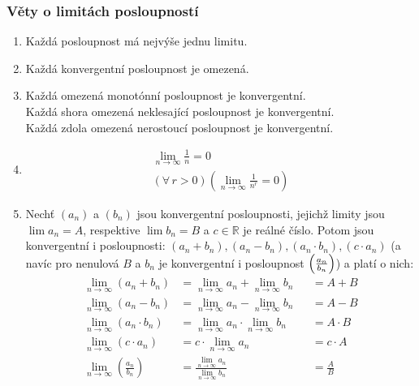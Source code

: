 \documentclass[12pt]{article}
\begin{document}
\subsubsection{Věty o limitách posloupností}
\begin{enumerate}
\item Každá posloupnost má nejvýše jednu limitu.
\item Každá konvergentní posloupnost je omezená.
\item Každá omezená monotónní posloupnost je konvergentní.\\
Každá shora omezená neklesající posloupnost je konvergentní.\\
Každá zdola omezená nerostoucí posloupnost je konvergentní.
\item 
\begin{align}
\lim_{n \to \infty} \frac{1}{n} = 0\\
\left( \forall \, r>0 \right) \left( \lim_{n \to \infty} \frac{1}{n^r} = 0 \right)
\end{align}
\item Nechť $(a_n)$ a $(b_n)$ jsou konvergentní posloupnosti, jejichž limity jsou $ \lim a_n = A$, respektive $ \lim b_n = B$ a $c \in \mathbb{R}$ je reálné číslo. Potom jsou konvergentní i posloupnosti: $(a_n + b_n), (a_n - b_n), (a_n \cdot b_n), (c \cdot a_n )$  (a navíc pro nenulová $B$ a $b_n$ je konvergentní i posloupnost $\left( \small \frac{ a_n}{b_n} \right)$) a platí o nich:
\begin{align}
\lim_{n \to \infty} (a_n + b_n) &= \lim_{n \to \infty}a_n + \lim_{n \to \infty} b_n &&= A + B\\
\lim_{n \to \infty} (a_n - b_n) &= \lim_{n \to \infty}a_n - \lim_{n \to \infty} b_n &&= A - B\\
\lim_{n \to \infty} (a_n \cdot b_n) &= \lim_{n \to \infty}a_n \cdot \lim_{n \to \infty} b_n &&= A \cdot B\\
\lim_{n \to \infty} (c \cdot a_n ) &= c \cdot \lim_{n \to \infty}a_n &&= c \cdot A\\
\lim_{n \to \infty} \left(\frac{a_n}{b_n} \right) &= \frac{\lim\limits_{n \to \infty} a_n}{\lim\limits_{n \to \infty} b_n} &&=\frac{A}{B}
\end{align}
\end{enumerate}
\end{document}
